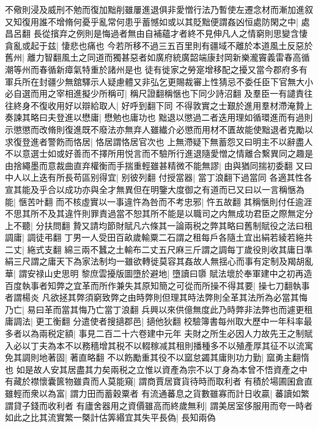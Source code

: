 不儆則浸及威刑不勉而復加黜削雖屢進退俱非愛憎行法乃暫使左遷念材而漸加進叙又知復用誰不增脩何憂乎亂常何患乎蓄憾如或以其貶黜便謂姦凶恒處防閑之中|{
	處昌呂翻}
長從擯弃之例則是悔過者無由自補蘊才者終不見伸凡人之情窮則思變含悽貪亂或起于兹|{
	悽悲也痛也}
今若所移不過三五百里則有疆域不離於本道風土反惡於舊州|{
	離力智翻風土之同道而獨甚惡者如廣府統廣韶端康封岡新樂瀧竇義雷春高循潮等州而春循新瘴氣特重於諸州是也}
徒有徙家之勞寔增移配之擾又當今郡府多有軍兵所在封疆少無舘驛示人疑慮體又非弘乞更賜裁審上性猜忌不委任臣下官無大小必自選而用之宰相進擬少所稱可|{
	稱尺證翻稱愜也下同少詩沼翻}
及羣臣一有譴責往往終身不復收用好以辯給取人|{
	好呼到翻下同}
不得敦實之士艱於進用羣材滯淹贄上奏諫其略曰夫登進以懋庸|{
	懋勉也庸功也}
黜退以懲過二者迭用理如循環進而有過則示懲懲而改脩則復進既不廢法亦無弃人雖纎介必懲而用材不匱故能使黜退者克勵以求復登進者警飭而恪居|{
	恪居謂恪居官次也}
上無滯疑下無蓄怨又曰明主不以辭盡人不以意選士如或好善而不擇所用悦言而不驗所行進退隨愛憎之情離合繫異同之趣是由捨繩墨而意裁曲直弃權衡而手揣重輕雖甚精微不能無謬|{
	由與猶同揣初委翻}
又曰中人以上迭有所長苟區别得宜|{
	别彼列翻}
付授當器|{
	當丁浪翻下過當同}
各適其性各宣其能及乎合以成功亦與全才無異但在明鑒大度御之有道而已又曰以一言稱愜為能|{
	愜苦叶翻}
而不核虛實以一事違忤為咎而不考忠邪|{
	忤五故翻}
其稱愜則付任逾涯不思其所不及其違忤則罪責過當不恕其所不能是以職司之内無成功君臣之際無定分上不聽|{
	分扶問翻}
贄又請均節財賦凡六條其一論兩税之弊其略曰舊制賦役之法曰租調庸|{
	調徒弔翻}
丁男一人受田百畝歲輸粟二石謂之租每戶各隨土宜出絹若綾若絁共二丈|{
	絁式支翻}
綿三兩不蠶之土輸布二丈五尺麻三斤謂之調每丁歲役則收其庸日準絹三尺謂之庸天下為家法制均一雖欲轉徙莫容其姦故人無揺心而事有定制及羯胡亂華|{
	謂安禄山史思明}
黎庶雲擾版圖墮於避地|{
	墮讀曰隳}
賦法壞於奉軍建中之初再造百度執事者知弊之宜革而所作兼失其原知簡之可從而所操不得其要|{
	操七刀翻執事者謂楊炎}
凡欲拯其弊須窮致弊之由時弊則但理其時法弊則全革其法所為必當其悔乃亡|{
	易曰革而當其悔乃亡當丁浪翻}
兵興以來供億無度此乃時弊非法弊也而遽更租庸調法|{
	更工衡翻}
分遣使者搜擿郡邑|{
	擿他狄翻}
校驗簿書每州取大歷中一年科率最多者以為兩税定額|{
	事見二百二十六卷建中元年}
夫財之所生必因人力故先王之制賦入必以丁夫為本不以務穡增其税不以輟稼减其租則播種多不以殖產厚其征不以流寓免其調則地著固|{
	著直略翻}
不以飭勵重其役不以窳怠蠲其庸則功力勤|{
	窳勇主翻惰也}
如是故人安其居盡其力矣兩税之立惟以資產為宗不以丁身為本曾不悟資產之中有藏於襟懷囊篋物雖貴而人莫能窺|{
	謂商賈居寶貨待時而取利者}
有積於場圃囷倉直雖輕而衆以為富|{
	謂力田而蓄穀粟者}
有流通蕃息之貨數雖寡而計日收贏|{
	蕃讀如繁謂貸子錢而收利者}
有廬舍器用之資價雖高而終歲無利|{
	謂美居室侈服用而夸一時者}
如此之比其流實繁一槩計估筭緡宜其失平長偽|{
	長知兩偽}

